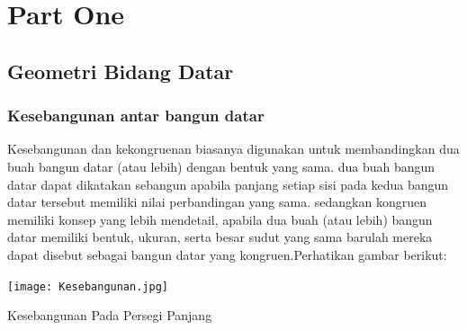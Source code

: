 \documentclass[11pt,fleqn]{book} %
\begin{document}


\pagestyle{empty} %

\tableofcontents %

\cleardoublepage %

\pagestyle{fancy} %


\part{Part One}



\chapter{Geometri Bidang Datar}
\section{Kesebangunan antar bangun datar}

Kesebangunan dan kekongruenan biasanya digunakan untuk membandingkan dua buah bangun datar (atau lebih) dengan bentuk yang sama. dua buah bangun datar dapat dikatakan sebangun apabila panjang setiap sisi pada kedua bangun datar tersebut memiliki nilai perbandingan yang sama. sedangkan kongruen memiliki konsep yang lebih mendetail, apabila dua buah (atau lebih) bangun datar memiliki bentuk, ukuran, serta besar sudut yang sama barulah mereka dapat disebut sebagai bangun datar yang kongruen.Perhatikan gambar berikut:

\texttt{[image: Kesebangunan.jpg]}


Kesebangunan Pada Persegi Panjang
\end{document}
